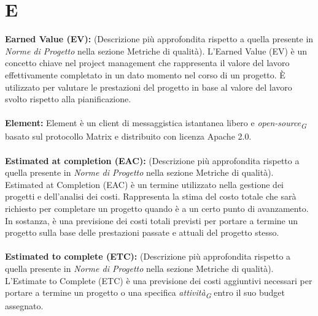 \documentclass{article}
\begin{document}
\section*{E}
{}
\textbf{Earned Value (EV):} (Descrizione più approfondita rispetto a quella presente in \textit{Norme di Progetto} nella sezione Metriche di qualità). L'Earned Value (EV) è un concetto chiave nel project management che rappresenta il valore del lavoro effettivamente completato in un dato momento nel corso di un progetto. È utilizzato per valutare le prestazioni del progetto in base al valore del lavoro svolto rispetto alla pianificazione.
\\
\\
\textbf{Element:} Element è un client di messaggistica istantanea libero e \textit{open-source}\textsubscript{\textit{G}} basato sul protocollo Matrix e distribuito con licenza Apache 2.0.
\\
\\
\textbf{Estimated at completion (EAC):} (Descrizione più approfondita rispetto a quella presente in \textit{Norme di Progetto} nella sezione Metriche di qualità). Estimated at Completion (EAC) è un termine utilizzato nella gestione dei progetti e dell'analisi dei costi. Rappresenta la stima del costo totale che sarà richiesto per completare un progetto quando è a un certo punto di avanzamento. In sostanza, è una previsione dei costi totali previsti per portare a termine un progetto sulla base delle prestazioni passate e attuali del progetto stesso.
\\
\\
\textbf{Estimated to complete (ETC):} (Descrizione più approfondita rispetto a quella presente in \textit{Norme di Progetto} nella sezione Metriche di qualità). L'Estimate to Complete (ETC) è una previsione dei costi aggiuntivi necessari per portare a termine un progetto o una specifica \textit{attività}\textsubscript{\textit{G}} entro il suo budget assegnato.
\\
\pagebreak
\end{document}
